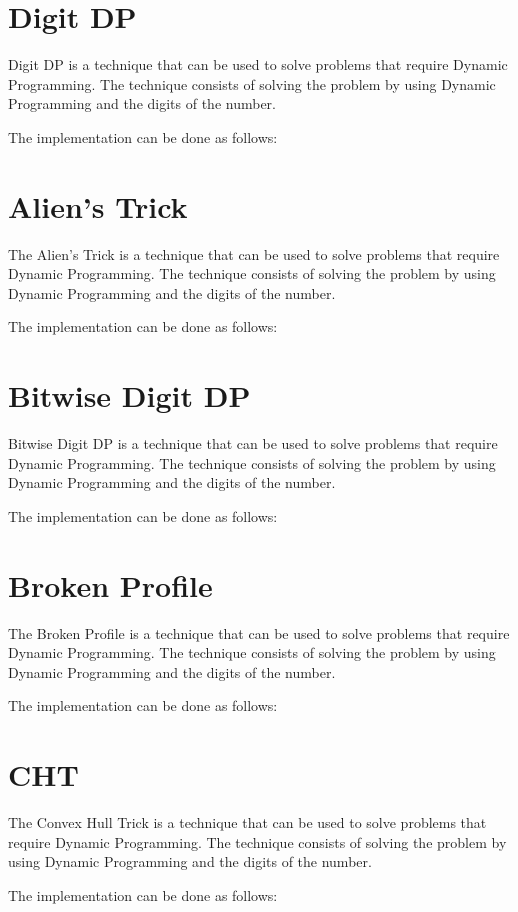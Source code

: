 

\section{Digit DP}

Digit DP is a technique that can be used to solve problems that require Dynamic Programming. The technique consists of solving the problem by using Dynamic Programming and the digits of the number.

The implementation can be done as follows:



\section{Alien's Trick}

The Alien's Trick is a technique that can be used to solve problems that require Dynamic Programming. The technique consists of solving the problem by using Dynamic Programming and the digits of the number.

The implementation can be done as follows:



\section{Bitwise Digit DP}

Bitwise Digit DP is a technique that can be used to solve problems that require Dynamic Programming. The technique consists of solving the problem by using Dynamic Programming and the digits of the number.

The implementation can be done as follows:



\section{Broken Profile}

The Broken Profile is a technique that can be used to solve problems that require Dynamic Programming. The technique consists of solving the problem by using Dynamic Programming and the digits of the number.

The implementation can be done as follows:



\section{CHT}

The Convex Hull Trick is a technique that can be used to solve problems that require Dynamic Programming. The technique consists of solving the problem by using Dynamic Programming and the digits of the number.

The implementation can be done as follows:





